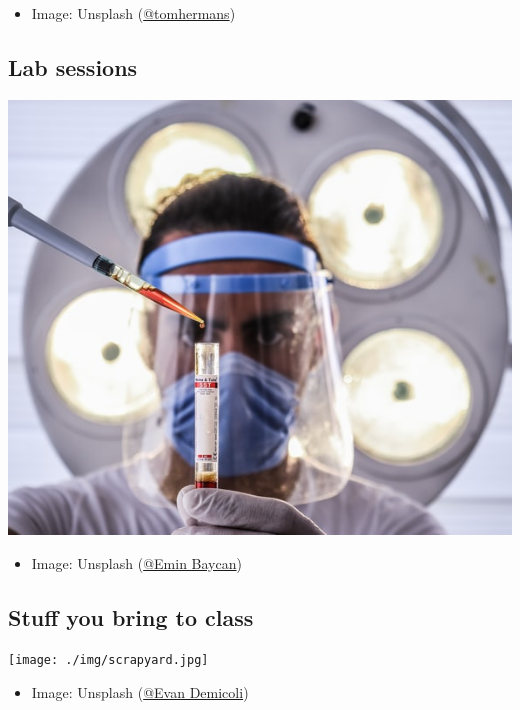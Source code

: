 \documentclass[11pt]{article}
\begin{document}
\begin{itemize}
\item Image: Unsplash (\href{https://unsplash.com/photos/9BoqXzEeQqM}{@tomhermans})
\end{itemize}

\subsection*{Lab sessions}
\label{sec:orgd30a45e}

\begin{center}
\includegraphics[width=.9\linewidth]{./img/lab.jpeg}
\end{center}

\begin{itemize}
\item Image: Unsplash (\href{https://unsplash.com/photos/MD2\_srN-02o}{@Emin Baycan})
\end{itemize}

\subsection*{Stuff you bring to class}
\label{sec:org69d5b3f}

\begin{center}
\texttt{[image: ./img/scrapyard.jpg]}
\end{center}

\begin{itemize}
\item Image: Unsplash (\href{https://unsplash.com/photos/HGCqL-tRcac}{@Evan Demicoli})
\end{itemize}
\end{document}
